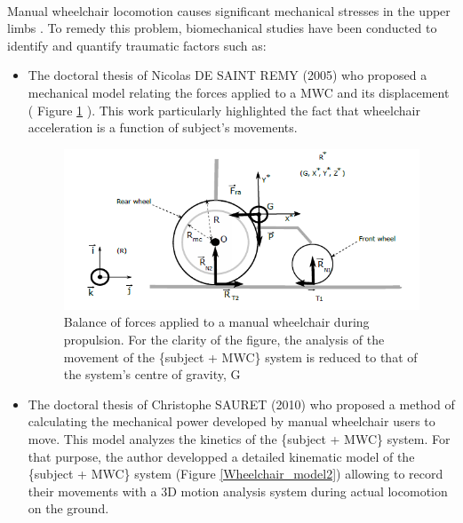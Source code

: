 \paragraph{}Manual wheelchair locomotion causes significant mechanical stresses in the upper limbs \cite{desroches2010expression}. To remedy this problem, biomechanical studies have been conducted to identify and quantify traumatic factors such as:
\begin{itemize}
\item The doctoral thesis of Nicolas DE SAINT REMY (2005) \cite{Remy2005} who proposed a
mechanical model relating the forces applied to a MWC and its displacement ( Figure \ref{Wheelchair_model} ). This work particularly highlighted the fact that wheelchair acceleration is a function of subject's movements.

\begin{figure}[h]
\center
\includegraphics[scale = 0.65]{images/wheelchair_model2}
\caption{Balance of forces applied to a manual wheelchair during propulsion. For the clarity of the figure, the analysis of the movement of the \{subject + MWC\} system is reduced to that of the system's centre of gravity, G \cite{Remy2005}}
\label{Wheelchair_model}
\end{figure}

\item The doctoral thesis of Christophe SAURET (2010) \cite{Sauret2010} who proposed a method of calculating the mechanical power developed by manual wheelchair users to move. This model analyzes the kinetics of the \{subject + MWC\} system. For that purpose, the author developped a detailed kinematic model of the \{subject + MWC\} system (Figure \ref{Wheelchair_model2}) allowing to record their movements with a 3D motion analysis system during actual locomotion on the ground. 



\end{itemize}
